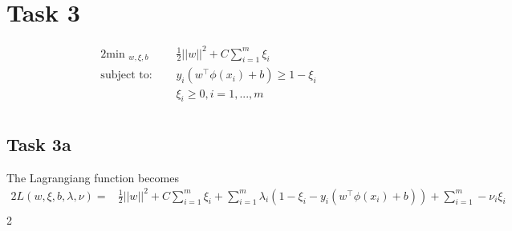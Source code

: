 \documentclass{article}
\begin{document}
	\section*{Task 3}
		\begin{alignat}{2}
			\text{min }_{w, \xi, b} \quad& \frac{1}{2}||w||^2+ C \sum_{i=1}^{m}\xi_i \\
			\text{subject to: } \quad& y_i(w^\top \phi(x_i) +b) \geq 1- \xi_i\\
			&\xi_i \geq 0, i=1,...,m \\
		\end{alignat}
	\subsection*{Task 3a}
		The Lagrangiang function becomes
		\begin{alignat}{2}
			L(w, \xi, b, \lambda, \nu) =& \frac{1}{2}||w||^2+ C \sum_{i=1}^{m}\xi_i + \sum_{i=1}^{m}\lambda_i\left( 1-\xi_i - y_i(w^\top \phi(x_i) +b)\right) + \sum_{i= 1}^{m} -\nu_i\xi_i \\
		\end{alignat}{2}
\end{document}
